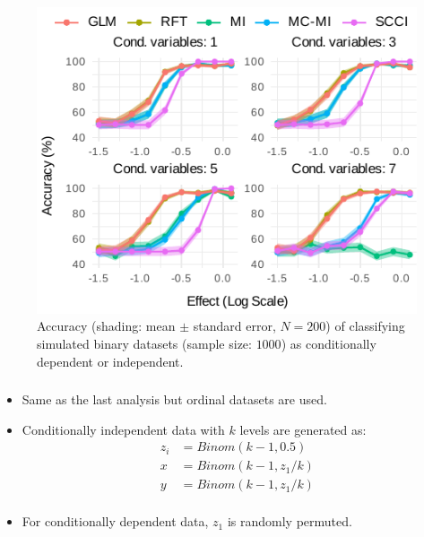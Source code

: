 \documentclass{beamer}
\begin{document}
\begin{frame}
	\frametitle{}
	\begin{figure}
		\centering
		\includegraphics{imgs/accuracy.pdf}
		\caption*{Accuracy (shading: mean $\pm$ standard error, $N=200$)
		of classifying simulated binary datasets (sample size: $1000$)
		as conditionally dependent or independent.}
	\end{figure}

\end{frame}

\begin{frame}
	\frametitle{}
	\begin{itemize}
		\item Same as the last analysis but ordinal datasets are used.
		\item Conditionally independent data with $ k $ levels are generated as:
			\begin{equation*}
				\begin{split}
					z_i &= \textit{Binom}(k-1, 0.5) \\
					x &= \textit{Binom}(k-1, z_1/k) \\
					y &= \textit{Binom}(k-1, z_1/k) \\
				\end{split}
			\end{equation*}
		\item For conditionally dependent data, $ z_1 $ is randomly permuted.
	\end{itemize}
\end{frame}
\end{document}
